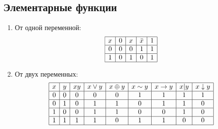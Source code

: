 \subsection{Элементарные функции} 
\begin{enumerate}
	\item От одной переменной:
	$$
	\begin{array}{|c|c|c|c|c|}
		\hline
		x & 0 & x & \bar{x} & 1 \\
		\hline
		0 & 0 & 0 & 1 & 1 \\
		\hline
		1 & 0 & 1 & 0 & 1 \\
		\hline
	\end{array}
	$$

	\item От двух переменных:
	$$
	\begin{array}{|c|c|c|c|c|c|c|c|c|c|}
		\hline
		 x & y & xy & x\vee y & x\oplus y & x\sim y & x\rightarrow y & x|y & x\downarrow y\\
		\hline
		 0 & 0 & 0 & 0 & 0 & 1 &  1 & 1 & 1 \\
		\hline
		 0 & 1 & 0 & 1 & 1 & 0 &  1 & 1 & 0 \\
		\hline
		 1 & 0 & 0 & 1 & 1 & 0 &  0 & 1 & 0  \\
		\hline
		 1 & 1 & 1 & 1 & 0 & 1 &  1 & 0 & 0 \\
		\hline
	\end{array}
	$$


\end{enumerate}
